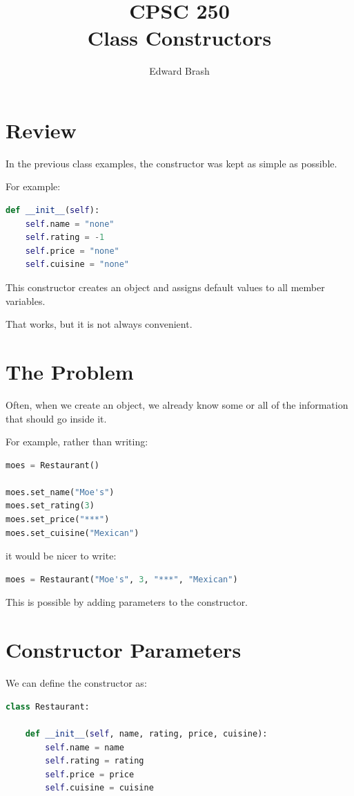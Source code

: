 \documentclass[11pt]{article}
\title{CPSC 250 \\ Class Constructors}
\author{Edward Brash}
\date{}
\begin{document}
\maketitle

\section{Review}

In the previous class examples, the constructor was kept as simple as possible.

For example:

\begin{lstlisting}[language=Python]
def __init__(self):
    self.name = "none"
    self.rating = -1
    self.price = "none"
    self.cuisine = "none"
\end{lstlisting}

This constructor creates an object and assigns default values to all member variables.

That works, but it is not always convenient.

\section{The Problem}

Often, when we create an object, we already know some or all of the information that should go inside it.

For example, rather than writing:

\begin{lstlisting}[language=Python]
moes = Restaurant()

moes.set_name("Moe's")
moes.set_rating(3)
moes.set_price("***")
moes.set_cuisine("Mexican")
\end{lstlisting}

it would be nicer to write:

\begin{lstlisting}[language=Python]
moes = Restaurant("Moe's", 3, "***", "Mexican")
\end{lstlisting}

This is possible by adding parameters to the constructor.

\section{Constructor Parameters}

We can define the constructor as:

\begin{lstlisting}[language=Python]
class Restaurant:

    def __init__(self, name, rating, price, cuisine):
        self.name = name
        self.rating = rating
        self.price = price
        self.cuisine = cuisine
\end{lstlisting}
\end{document}
